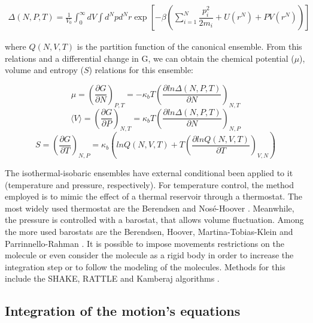 \begin{equation}
\label{eq:partiso}
\begin{aligned}
\Delta (N,P,T) = \frac{1}{V_{0}} \int_{0}^{\infty} dV \int d^{N}p d^{N}r \exp \left[ -\beta \left( \sum_{i=1}^{N}\dfrac{p_{i}^{2}}{2m_{i}} + U(r^{N}) + PV(r^{N}) \right) \right]
\end{aligned}
\end{equation}

where $Q (N,V,T)$ is the partition function of the canonical ensemble. From this relations and a differential change in G, we can obtain the chemical potential ($\mu$), volume and entropy ($S$) relations for this ensemble:

\begin{equation}
\mu = (\frac{\partial G}{\partial N})_{P,T} = - \kappa_{b} T (\frac{\partial ln \Delta (N,P,T)}{\partial N})_{N,T}
\end{equation}  
\begin{equation}
\langle V \rangle= (\frac{\partial G}{\partial P})_{N,T}= \kappa_{b} T (\frac{\partial ln \Delta (N,P,T)}{\partial N})_{N,P}
\end{equation}
\begin{equation}
S = (\frac{\partial G}{\partial T})_{N,P}= \kappa_{b}  (ln Q(N,V,T)+ T(\frac{\partial ln Q (N,V,T)}{\partial T})_{V,N})
\end{equation}

The isothermal-isobaric ensembles have external conditional been applied to it (temperature and pressure, respectively). For temperature control, the method employed  is to mimic the effect of a thermal reservoir through a thermostat. The most widely used thermostat are the Berendsen and Nosé-Hoover \cite{doi:10.1063/1.448118,PhysRevA.31.1695}. Meanwhile, the pressure is controlled with a barostat, that allows volume fluctuation. Among the more used barostats are the Berendsen, Hoover, Martina-Tobias-Klein and Parrinnello-Rahman \cite{doi:10.1063/1.448118,PhysRevA.31.1695,doi:10.1063/1.467468,doi:10.1063/1.328693}. It is possible to impose movements restrictions on the molecule or even consider the molecule as a rigid body in order to increase the integration step or to follow the modeling of the molecules. Methods for this include the SHAKE, RATTLE and Kamberaj algorithms \cite{RYCKAERT1977327,anderson1983,kamberaj}.

\subsection{Integration of the motion's equations}

